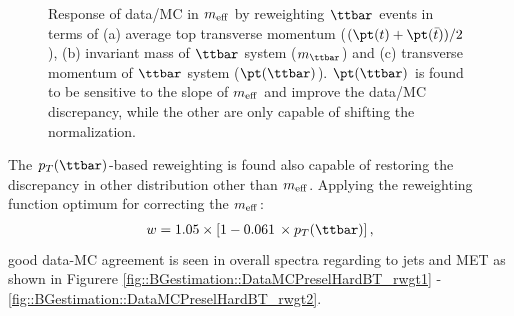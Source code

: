 \begin{figure}[h]
  \centering
    \caption{ Response of data/MC in $m_{\mathrm{eff}}$ by reweighting $\ttbar$ events in terms of (a) average top transverse momentum
 ($(\pt(t)+\pt(\bar{t}))/2$), (b) invariant mass of $\ttbar$ system ($m_{\ttbar}$) and (c) transverse momentum of $\ttbar$ system ($\pt(\ttbar)$). $\pt(\ttbar)$ is found to be sensitive to the slope of $m_{\mathrm{eff}}$ and improve the data/MC discrepancy, while the other are only capable of shifting the normalization. 
\label{fig::BGestimation::slope_rwgt} }
\end{figure}


\clearpage
The $p_T(\ttbar)$-based reweighting is found also capable of restoring the discrepancy in other distribution other than $m_{\mathrm{eff}}$. Applying the reweighting function optimum for correcting the $m_{\mathrm{eff}}$:
\begin{align}
w = 1.05 \times \left[ 1 - 0.061 \,\times p_T(\ttbar) \right] \label{eq::BGestimation::rwgt_ttPt},
\end{align}
good data-MC agreement is seen in overall spectra regarding to jets and MET as shown in Figurere \ref{fig::BGestimation::DataMCPreselHardBT_rwgt1} - \ref{fig::BGestimation::DataMCPreselHardBT_rwgt2}. \\

